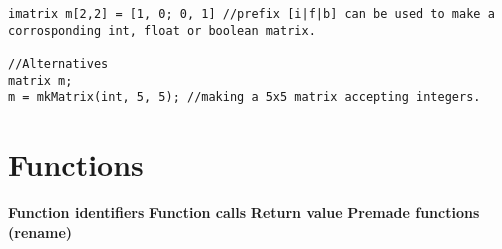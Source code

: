 \begin{lstlisting}[caption={Creating a matrix},label={lst:matrix}]
imatrix m[2,2] = [1, 0; 0, 1] //prefix [i|f|b] can be used to make a corrosponding int, float or boolean matrix.

//Alternatives
matrix m;
m = mkMatrix(int, 5, 5); //making a 5x5 matrix accepting integers.
\end{lstlisting}


\section{Functions}
\textbf{Function identifiers}
\textbf{Function calls}
\textbf{Return value}
\textbf{Premade functions (rename)}


%



